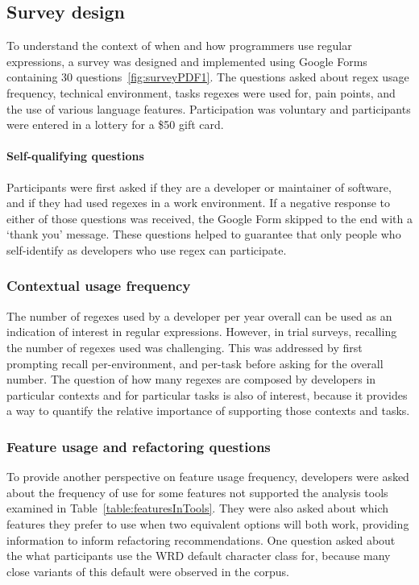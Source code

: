 \subsection{Survey design}

To understand the context of when and how programmers use regular expressions, a survey was designed and implemented using Google Forms containing 30 questions~\ref{fig:surveyPDF1}. The questions asked about regex usage frequency, technical environment, tasks regexes were used for, pain points, and the use of various language
features. Participation was voluntary and participants were entered in a lottery for a \$50 gift card.


\paragraph{Self-qualifying questions} Participants were first asked if they are a developer or maintainer of software, and if they had used regexes in a work environment.  If a negative response to either of those questions was received, the Google Form skipped to the end with a `thank you' message.  These questions helped to guarantee that only people who self-identify as developers who use regex can participate.

\subsubsection{Contextual usage frequency}
The number of regexes used by a developer per year overall can be used as an indication of interest in regular expressions.  However, in trial surveys, recalling the number of regexes used was challenging.  This was addressed by first prompting recall per-environment, and per-task before asking for the overall number.  The question of how many regexes are composed by developers in particular contexts and for particular tasks is also of interest, because it provides a way to quantify the relative importance of supporting those contexts and tasks.

\subsubsection{Feature usage and refactoring questions}
To provide another perspective on feature usage frequency, developers were asked about the frequency of use for some features not supported the analysis tools examined in Table~\ref{table:featuresInTools}.  They were also asked about which features they prefer to use when two equivalent options will both work, providing information to inform refactoring recommendations.  One question asked about the what participants use the WRD default character class for, because many close variants of this default were observed in the corpus.

